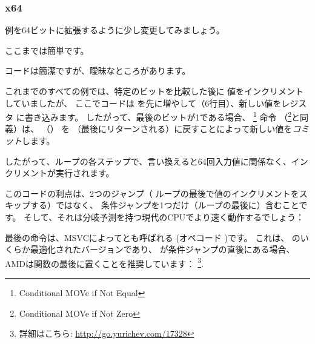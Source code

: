 ﻿\subsubsection{x64}
\label{subsec:popcnt}

例を64ビットに拡張するように少し変更してみましょう。




ここまでは簡単です。






コードは簡潔ですが、曖昧なところがあります。

これまでのすべての例では、特定のビットを比較した後に 値をインクリメントしていましたが、
ここでコードは を先に増やして（6行目）、新しい値をレジスタ \EDX に書き込みます。
したがって、最後のビットが1である場合、 \CMOVNE\footnote{Conditional MOVe if Not Equal} 命令
（\CMOVNZ\footnote{Conditional MOVe if Not Zero}と同義）は、 \EDX （）
を \EAX （最後にリターンされる）に戻すことによって新しい値を\emph{コミット}します。

したがって、ループの各ステップで、言い換えると64回入力値に関係なく、インクリメントが実行されます。

このコードの利点は、2つのジャンプ（ ループの最後で値のインクリメントをスキップする）ではなく、
条件ジャンプを1つだけ（ループの最後に）含むことです。
そして、それは分岐予測を持つ現代のCPUでより速く動作するでしょう：

\label{FATRET}
最後の命令は、MSVCによってとも呼ばれる
 (オペコード )です。
これは、 \RET のいくらか最適化されたバージョンであり、
\RET が条件ジャンプの直後にある場合、AMDは関数の最後に置くことを推奨しています：
\footnote{詳細はこちら: \url{http://go.yurichev.com/17328}}.




